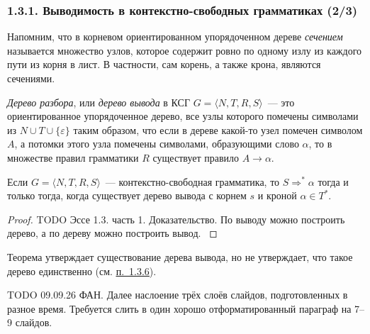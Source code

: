 \documentclass[mathserif,12pt,aspectratio=169]{beamer}
\renewcommand{\index}[1]{}
\def\odmkey#1#2{{\it\color{red} #1}\index{#2}}
\def\DMref#1#2{{\color{blue}\underline{\hyperlink{#2}{#1}}}}
\def\TODO#1{{\color{gray} TODO {#1}}}
\begin{document}
\begin{frame}
\frametitle{1.3.1. Выводимость в контекстно-свободных грамматиках (2/3)}

Напомним, что в корневом ориентированном упорядоченном дереве
\odmkey{сечением}{Сечение!дерева}
называется множество узлов,
которое содержит ровно по одному излу из каждого пути из корня
в лист. 
В частности, сам корень, а также крона, являются сечениями.


\odmkey{Дерево разбора}{Дерево!разбора}, 
или \odmkey{дерево вывода}{Дерево вывода}
в КСГ $G=\langle N, T, R, S\rangle$~---
это ориентированное упорядоченное дерево,
все узлы которого помечены 
символами из $N\cup T \cup \{\varepsilon\}$
таким образом, что если в дереве
какой-то узел помечен символом $A$,
а потомки этого узла помечены символами,
образующими слово 
$\alpha$,
то в множестве правил грамматики $R$
существует правило $A\to\alpha$.


\begin{theorem}
Если $G=\langle N, T, R, S\rangle$~--- контекстно-свободная грамматика, то 
$S\Rightarrow^*\alpha$ тогда и только тогда,
когда существует дерево вывода с корнем $s$ и кроной $\alpha\in T^*$.
\end{theorem}

\begin{proof}
 \TODO{Эссе 1.3. часть 1. Доказательство. По выводу можно построить дерево, а по дереву можно построить вывод. 
}
\end{proof}

\begin{remark} 
Теорема утверждает существование дерева вывода,
но не утверждает, что такое дерево единственно
(см. \DMref{п.~1.3.6}{1.3.6.}).
\end{remark}
\TODO{09.09.26 ФАН. Далее наслоение трёх слоёв слайдов, подготовленных в разное время. Требуется слить в один хорошо отформатированный параграф на 7--9 слайдов.}
\end{frame}
\end{document}

